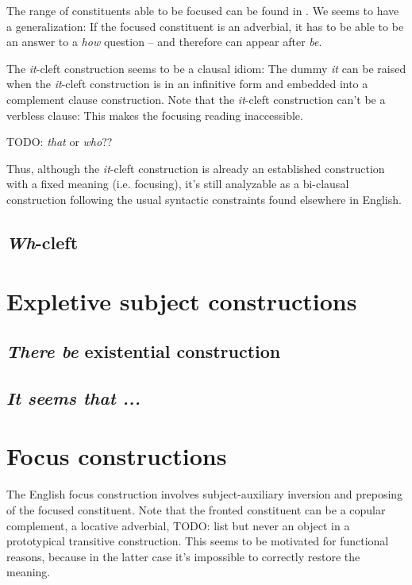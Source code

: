 \documentclass[UTF8, a4paper, oneside, scheme=plain]{ctexrep}
\newcommand*{\citepages}[1]{pp.~{#1}}
\newcommand{\corpus}[1]{\emph{#1}}
\begin{document}
The range of constituents able to be focused 
can be found in \citet[\citepages{1417-1419}]{cgel}.
We seems to have a generalization: 
If the focused constituent is an adverbial, 
it has to be able to be an answer to a \corpus{how} question -- 
and therefore can appear after \corpus{be}.

The \corpus{it}-cleft construction seems to be a clausal idiom:
The dummy \corpus{it} can be raised
when the \corpus{it}-cleft construction is in an infinitive form 
and embedded into a complement clause construction.
Note that the \corpus{it}-cleft construction can't be a verbless clause: 
This makes the focusing reading inaccessible.

TODO: \corpus{that} or \corpus{who}?? 

Thus, although the \corpus{it}-cleft construction 
is already an established construction with a fixed meaning (i.e. focusing),
it's still analyzable as a bi-clausal construction
following the usual syntactic constraints found elsewhere in English.

\subsection{\corpus{Wh}-cleft}

\section{Expletive subject constructions}

\subsection{\corpus{There be} existential construction}

\begin{exe}
    \ex 
\end{exe}

\subsection{\corpus{It seems that ...}}

\section{Focus constructions}

The English focus construction involves subject-auxiliary inversion 
and preposing of the focused constituent.
Note that the fronted constituent can be a copular complement,
a locative adverbial, TODO: list 
but never an object in a prototypical transitive construction.
This seems to be motivated for functional reasons,
because in the latter case it's impossible to correctly restore the meaning.
\end{document}
